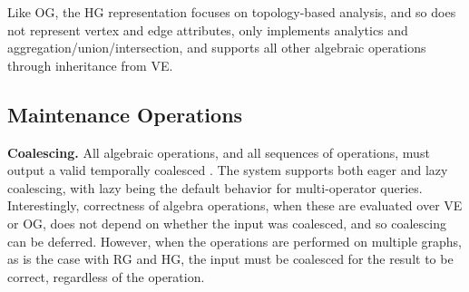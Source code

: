 Like OG, the HG representation focuses on topology-based analysis, and
so does not represent vertex and edge attributes, only implements
analytics and aggregation/union/intersection, and supports all other
algebraic operations through inheritance from VE.

\subsection{Maintenance Operations}
\label{sec:sys:maint}


{\bf Coalescing.}  All algebraic operations, and all sequences of
operations, must output a valid temporally coalesced \tg.  The \ql
system supports both eager and lazy coalescing, with lazy being the
default behavior for multi-operator queries.  Interestingly,
correctness of \tg algebra operations, when these are evaluated over
VE or OG, does not depend on whether the input was coalesced, and so
coalescing can be deferred.  However, when the operations are
performed on multiple graphs, as is the case with RG and HG, the input
must be coalesced for the result to be correct, regardless of the
operation. 



